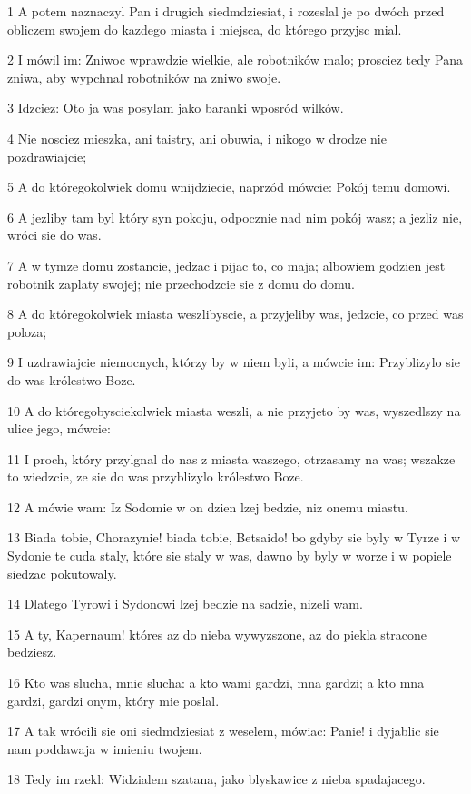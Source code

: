 \par 1 A potem naznaczyl Pan i drugich siedmdziesiat, i rozeslal je po dwóch przed obliczem swojem do kazdego miasta i miejsca, do którego przyjsc mial.
\par 2 I mówil im: Zniwoc wprawdzie wielkie, ale robotników malo; prosciez tedy Pana zniwa, aby wypchnal robotników na zniwo swoje.
\par 3 Idzciez: Oto ja was posylam jako baranki wposród wilków.
\par 4 Nie nosciez mieszka, ani taistry, ani obuwia, i nikogo w drodze nie pozdrawiajcie;
\par 5 A do któregokolwiek domu wnijdziecie, naprzód mówcie: Pokój temu domowi.
\par 6 A jezliby tam byl który syn pokoju, odpocznie nad nim pokój wasz; a jezliz nie, wróci sie do was.
\par 7 A w tymze domu zostancie, jedzac i pijac to, co maja; albowiem godzien jest robotnik zaplaty swojej; nie przechodzcie sie z domu do domu.
\par 8 A do któregokolwiek miasta weszlibyscie, a przyjeliby was, jedzcie, co przed was poloza;
\par 9 I uzdrawiajcie niemocnych, którzy by w niem byli, a mówcie im: Przyblizylo sie do was królestwo Boze.
\par 10 A do któregobysciekolwiek miasta weszli, a nie przyjeto by was, wyszedlszy na ulice jego, mówcie:
\par 11 I proch, który przylgnal do nas z miasta waszego, otrzasamy na was; wszakze to wiedzcie, ze sie do was przyblizylo królestwo Boze.
\par 12 A mówie wam: Iz Sodomie w on dzien lzej bedzie, niz onemu miastu.
\par 13 Biada tobie, Chorazynie! biada tobie, Betsaido! bo gdyby sie byly w Tyrze i w Sydonie te cuda staly, które sie staly w was, dawno by byly w worze i w popiele siedzac pokutowaly.
\par 14 Dlatego Tyrowi i Sydonowi lzej bedzie na sadzie, nizeli wam.
\par 15 A ty, Kapernaum! któres az do nieba wywyzszone, az do piekla stracone bedziesz.
\par 16 Kto was slucha, mnie slucha: a kto wami gardzi, mna gardzi; a kto mna gardzi, gardzi onym, który mie poslal.
\par 17 A tak wrócili sie oni siedmdziesiat z weselem, mówiac: Panie! i dyjablic sie nam poddawaja w imieniu twojem.
\par 18 Tedy im rzekl: Widzialem szatana, jako blyskawice z nieba spadajacego.
